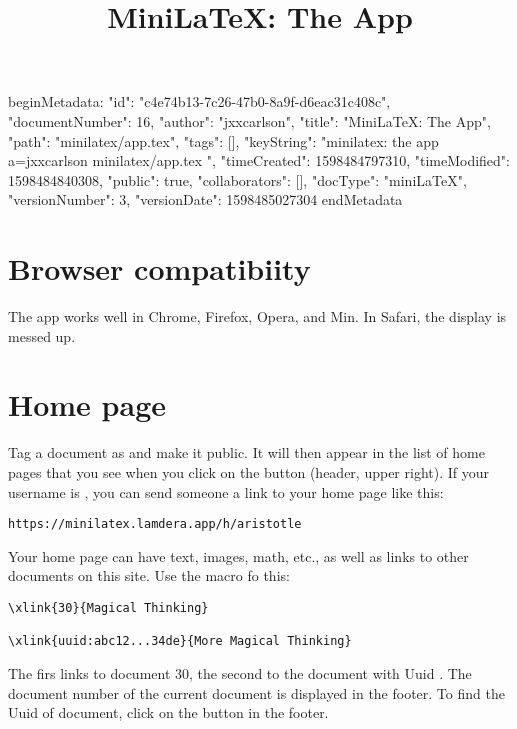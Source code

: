 beginMetadata:
{
    "id": "c4e74b13-7c26-47b0-8a9f-d6eac31c408c",
    "documentNumber": 16,
    "author": "jxxcarlson",
    "title": "MiniLaTeX: The App",
    "path": "minilatex/app.tex",
    "tags": [],
    "keyString": "minilatex: the app a=jxxcarlson minilatex/app.tex ",
    "timeCreated": 1598484797310,
    "timeModified": 1598484840308,
    "public": true,
    "collaborators": [],
    "docType": "miniLaTeX",
    "versionNumber": 3,
    "versionDate": 1598485027304
}
endMetadata
\title{MiniLaTeX: The App}

\maketitle

\tableofcontents


\section{Browser compatibiity}

The app works well in Chrome, Firefox, Opera, and Min.   In Safari, the display is messed up.

\section{Home page}

Tag a document as   and make it public.  It will then appear in the list of home pages that you see when you click on the button  (header, upper right).  If your username is , you can send someone a link to your home page like this:

\begin{verbatim}
https://minilatex.lamdera.app/h/aristotle
\end{verbatim}

Your home page can have text, images, math, etc., as well as links to other documents on this site.  Use the  macro fo this:

\begin{verbatim}
\xlink{30}{Magical Thinking}

\xlink{uuid:abc12...34de}{More Magical Thinking}
\end{verbatim}

The firs links to document 30, the second to the document with Uuid .  The document number of the current document is displayed in the footer.  To find the Uuid of  document, click on the button  in the footer. 

